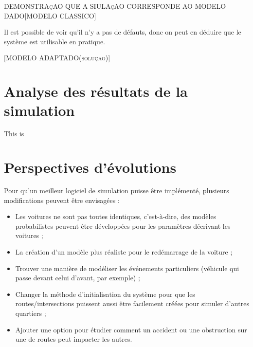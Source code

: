 \documentclass[12pt]{article} %
\begin{document}
\textsc{\Large DEMONSTRAçAO QUE A SIULAçAO CORRESPONDE AO MODELO DADO[MODELO CLASSICO]}

Il est possible de voir qu'il n'y a pas de défauts, donc on peut en déduire que le système est utilisable en pratique.

\textsc{\Large [MODELO ADAPTADO(soluçao)]}

\newpage
\section{Analyse des résultats de la simulation}\label{resultats}
This is

\newpage
\section{Perspectives d'évolutions}\label{evolution}
Pour qu’un meilleur logiciel de simulation puisse être implémenté, plusieurs modifications peuvent être envisagées : 

\begin{itemize}
\item Les voitures ne sont pas toutes identiques, c’est-à-dire, des modèles probabilistes peuvent être développées pour les paramètres décrivant les voitures ;\\

\item La création d’un modèle plus réaliste pour le redémarrage de la voiture ;\\

\item Trouver une manière de modéliser les événements particuliers (véhicule qui passe devant celui d’avant, par exemple) ;\\

\item Changer la méthode d'initialisation du système pour que les routes/intersections puissent aussi être facilement créées pour simuler d'autres quartiers ;\\

\item Ajouter une option pour étudier comment un accident ou une obstruction sur une de routes peut impacter les autres.
\end{itemize} 

\newpage


\nocite{*}
\end{document}
